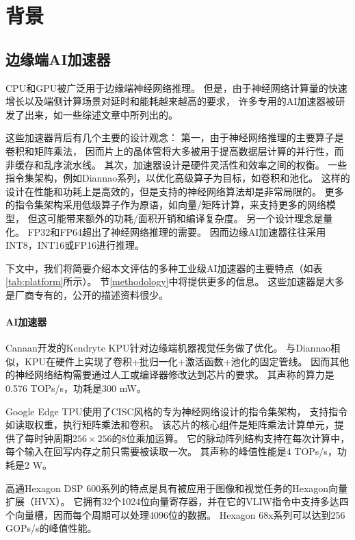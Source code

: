 \section{背景}
\label{background}

\subsection{边缘端AI加速器}
CPU和GPU被广泛用于边缘端神经网络推理。
但是，由于神经网络计算量的快速增长以及端侧计算场景对延时和能耗越来越高的要求，
许多专用的AI加速器被研发了出来，如一些综述文章\cite{chen2020survey, reuther2019survey}中所列出的。

这些加速器背后有几个主要的设计观念：
第一，由于神经网络推理的主要算子是卷积和矩阵乘法，
因而片上的晶体管将大多被用于提高数据层计算的并行性，而非缓存和乱序流水线\cite{jouppi2018domain}。
其次，加速器设计是硬件灵活性和效率之间的权衡。
一些指令集架构，例如Diannao系列\cite{chen2014diannao}，以优化高级算子为目标，如卷积和池化。
这样的设计在性能和功耗上是高效的，但是支持的神经网络算法却是非常局限的。
更多的指令集架构采用低级算子作为原语，如向量/矩阵计算，来支持更多的网络模型，
但这可能带来额外的功耗/面积开销\cite{liu2016cambricon}和编译复杂度。
另一个设计理念是量化。
FP32和FP64超出了神经网络推理的需要\cite{hennessy2019new}。
因而边缘AI加速器往往采用INT8，INT16或FP16进行推理。

下文中，我们将简要介绍本文评估的多种工业级AI加速器的主要特点（如表\ref{tab:platform}所示）。
节\ref{methodology}中将提供更多的信息。
这些加速器是大多是厂商专有的，公开的描述资料很少。

\paragraph{AI加速器}
Canaan开发的Kendryte KPU\cite{k210}针对边缘端机器视觉任务做了优化。
与Diannao相似，KPU在硬件上实现了卷积+批归一化+激活函数+池化的固定管线。
因而其他的神经网络结构需要通过人工或编译器修改达到芯片的要求。
其声称的算力是0.576 TOPs/s，功耗是300 mW。

Google Edge TPU\cite{jouppi2018domain}使用了CISC风格的专为神经网络设计的指令集架构，
支持指令如读取权重，执行矩阵乘法和卷积。
该芯片的核心组件是矩阵乘法计算单元，提供了每时钟周期$256\times 256$的8位乘加运算。
它的脉动阵列结构\cite{kung1979systolic}支持在每次计算中，每个输入在回写内存之前只需要被读取一次。
其声称的峰值性能是4 TOPs/s，功耗是2 W。

高通Hexagon DSP 600系列\cite{dsp}的特点是具有被应用于图像和视觉任务的Hexagon向量扩展（HVX）。
它拥有32个1024位向量寄存器，并在它的VLIW指令中支持多达四个向量槽，因而每个周期可以处理4096位的数据。
Hexagon 68x系列可以达到256 GOPs/s的峰值性能。

